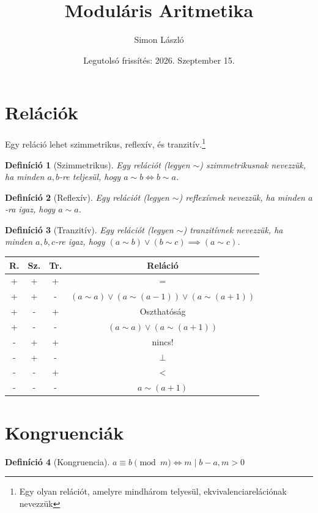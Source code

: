 \documentclass{article}
\title{Moduláris Aritmetika}
\author{Simon László}
\date{Legutolsó frissítés: 2026. Szeptember 15.}
\newtheorem{definition}{Definíció}[section]
\begin{document}
\maketitle
\tableofcontents
\newpage

\section{Relációk}
Egy reláció lehet szimmetrikus, reflexív, és tranzitív.\footnote{Egy olyan relációt, amelyre mindhárom telyesül, ekvivalenciarelációnak nevezzük}
\begin{definition}[Szimmetrikus]
    Egy relációt (legyen $\sim$) szimmetrikusnak nevezzük, ha minden $a,b$-re teljesül, hogy $a \sim b \iff b \sim a$.
\end{definition}
\begin{definition}[Reflexív]
    Egy relációt (legyen $\sim$) reflexívnek nevezzük, ha minden $a$-ra igaz, hogy $a \sim a$.
\end{definition}
\begin{definition}[Tranzitív]
    Egy relációt (legyen $\sim$) tranzitívnek nevezzük, ha minden $a, b, c$-re igaz, hogy $(a \sim b) \vee (b \sim c) \implies (a \sim c)$.
\end{definition}

\begin{center}
\begin{tabular}{c|c|c|c|}
    R. & Sz. & Tr. & Reláció \\
    \hline
    + & + & + & = \\
    \hline
    + & + & - & $(a \sim a) \vee (a \sim (a-1)) \vee (a \sim (a+1))$ \\
    \hline
    + & - & + & Oszthatóság \\
    \hline
    + & - & - & $(a \sim a)\vee (a \sim (a+1))$ \\
    \hline
    - & + & + & nincs! \\
    \hline
    - & + & - & $\perp$ \\
    \hline 
    - & - & + & < \\
    \hline
    - & - & - & $a \sim (a+1)$ \\
\end{tabular}
\end{center}

\section{Kongruenciák}
\begin{definition}[Kongruencia]
    $a \equiv b \pmod{m} \iff m \mid b - a, m > 0$
\end{definition}
\end{document}
